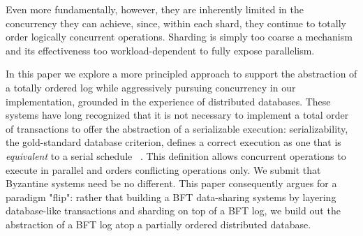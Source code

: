 Even more fundamentally, however, they are inherently limited in the concurrency  they can achieve, since, within each shard,  they continue to totally order logically concurrent operations. Sharding is simply too coarse a mechanism and its effectiveness too workload-dependent to fully expose parallelism.

In this paper we explore a more principled approach to support the abstraction of a totally ordered log while aggressively pursuing concurrency in our implementation, grounded in the experience of distributed databases.  These systems have long recognized that it is not necessary to implement a total order of transactions to offer the abstraction of a serializable execution: serializability, the gold-standard database criterion, defines a correct execution as one that is \textit{equivalent} to a serial schedule ~\cite{bernstein1979fas,Papadimitriou1979serializability,bernstein1979fas}.  This definition allows concurrent operations to execute in parallel and orders conflicting operations only.  We submit that Byzantine systems need be no different. This paper consequently argues for a paradigm "flip": rather that building a BFT data-sharing systems by layering database-like transactions and sharding on top of a BFT log, we  build out the abstraction of a BFT log atop a partially ordered distributed database.



\iffalse




